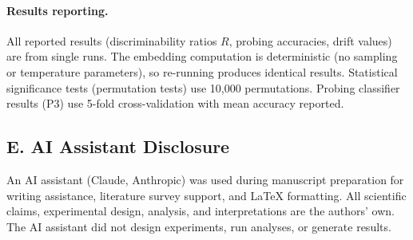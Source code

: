 \documentclass[11pt]{article}
\theoremstyle{definition}
\begin{document}
\paragraph{Results reporting.}
All reported results (discriminability ratios $R$, probing accuracies, drift values) are from single runs. The embedding computation is deterministic (no sampling or temperature parameters), so re-running produces identical results. Statistical significance tests (permutation tests) use 10,000 permutations. Probing classifier results (P3) use 5-fold cross-validation with mean accuracy reported.

\subsection*{E. AI Assistant Disclosure}
An AI assistant (Claude, Anthropic) was used during manuscript preparation for writing assistance, literature survey support, and LaTeX formatting. All scientific claims, experimental design, analysis, and interpretations are the authors' own. The AI assistant did not design experiments, run analyses, or generate results.
\end{document}
